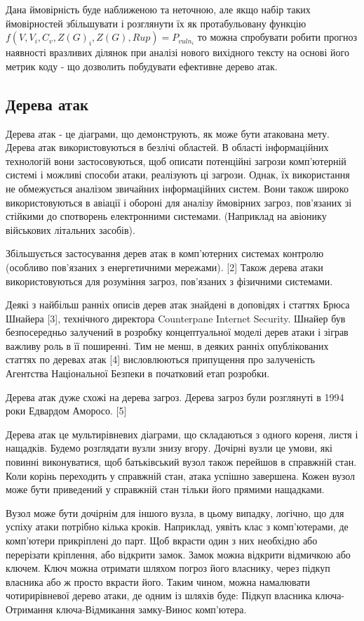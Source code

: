 Дана ймовірність буде наближеною та неточною, але якщо набір таких ймовірностей збільшувати і розглянути їх як протабульовану функцію
$f(V,V_i,C_v,Z(G)_i,Z(G),Rup) = P_{vuln_i}$
то можна спробувати робити прогноз наявності вразливих ділянок при аналізі нового вихідного тексту на основі  його метрик коду - що дозволить побудувати ефективне дерево атак.


\subsection{Дерева атак}
\label{2section:id14}
Дерева атак - це діаграми, що демонструють, як може бути атакована мету. Дерева атак використовуються в безлічі областей. В області інформаційних технологій вони застосовуються, щоб описати потенційні загрози комп'ютерній системі і можливі способи атаки, реалізують ці загрози. Однак, їх використання не обмежується аналізом звичайних інформаційних систем. Вони також широко використовуються в авіації і обороні для аналізу ймовірних загроз, пов'язаних зі стійкими до спотворень електронними системами. (Наприклад на авіонику військових літальних засобів).

Збільшується застосування дерев атак в комп'ютерних системах контролю (особливо пов'язаних з енергетичними мережами). {[}2{]} Також дерева атаки використовуються для розуміння загроз, пов'язаних з фізичними системами.

Деякі з найбільш ранніх описів дерев атак знайдені в доповідях і статтях Брюса Шнайера {[}3{]}, технічного директора Counterpane Internet Security. Шнайер був безпосередньо залучений в розробку концептуальної моделі дерев атаки і зіграв важливу роль в її поширенні. Тим не менш, в деяких ранніх опублікованих статтях по деревах атак {[}4{]} висловлюються припущення про залученість Агентства Національної Безпеки в початковий етап розробки.

Дерева атак дуже схожі на дерева загроз. Дерева загроз були розглянуті в 1994 роки Едвардом Аморосо. {[}5{]}

Дерева атак це мультирівневих діаграми, що складаються з одного кореня, листя і нащадків. Будемо розглядати вузли знизу вгору. Дочірні вузли це умови, які повинні виконуватися, щоб батьківський вузол також перейшов в справжній стан. Коли корінь переходить у справжній стан, атака успішно завершена. Кожен вузол може бути приведений у справжній стан тільки його прямими нащадками.

Вузол може бути дочірнім для іншого вузла, в цьому випадку, логічно, що для успіху атаки потрібно кілька кроків. Наприклад, уявіть клас з комп'ютерами, де комп'ютери прикріплені до парт. Щоб вкрасти один з них необхідно або перерізати кріплення, або відкрити замок. Замок можна відкрити відмичкою або ключем. Ключ можна отримати шляхом погроз його власнику, через підкуп власника або ж просто вкрасти його. Таким чином, можна намалювати чотирирівневої дерево атаки, де одним із шляхів буде: Підкуп власника ключа-Отримання ключа-Відмикання замку-Винос комп'ютера.

